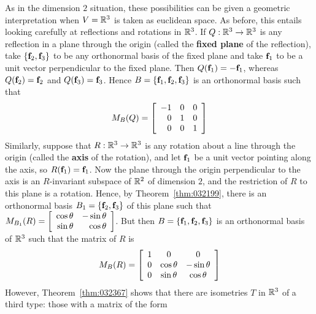 As in the dimension $2$ situation, these possibilities can be given a geometric interpretation when $V = \mathbb{R}^3$ is taken as euclidean space. As before, this entails looking carefully at reflections and rotations in $\mathbb{R}^3$. If $Q : \mathbb{R}^3 \to \mathbb{R}^3$ is any reflection in a plane through the origin (called the \textbf{fixed plane} of the reflection), take $\{\textbf{f}_{2}, \textbf{f}_{3}\}$ to be any orthonormal basis of the fixed plane and take $\textbf{f}_{1}$ to be a unit vector perpendicular to the fixed plane. Then $Q(\textbf{f}_{1}) = -\textbf{f}_{1}$, whereas $Q(\textbf{f}_{2}) = \textbf{f}_{2}$ and $Q(\textbf{f}_{3}) = \textbf{f}_{3}$. Hence $B = \{\textbf{f}_{1}, \textbf{f}_{2}, \textbf{f}_{3}\}$ is an orthonormal basis such that
\begin{equation*}
M_B(Q) =
\left[ \begin{array}{rrr}
-1 & 0 & 0 \\
0 & 1 & 0 \\
0 & 0 & 1
\end{array} \right]
\end{equation*}
Similarly, suppose that $R : \mathbb{R}^3 \to \mathbb{R}^3$ is any rotation about a line through the origin (called the \textbf{axis} of the rotation), and let $\textbf{f}_{1}$ be a unit vector pointing along the axis, so $R(\textbf{f}_{1}) = \textbf{f}_{1}$. Now the plane through the origin perpendicular to the axis is an $R$-invariant subspace of $\mathbb{R}^2$ of dimension $2$, and the restriction of $R$ to this plane is a rotation. Hence, by Theorem~\ref{thm:032199}, there is an orthonormal basis $B_{1} = \{\textbf{f}_{2}, \textbf{f}_{3}\}$ of this plane such that $M_{B_1}(R) = 
\left[ \begin{array}{rr}
\cos \theta & - \sin \theta \\
\sin \theta & \cos \theta
\end{array} \right]$. But then $B = \{\textbf{f}_{1}, \textbf{f}_{2}, \textbf{f}_{3}\}$ is an orthonormal basis of $\mathbb{R}^3$ such that the matrix of $R$ is
\begin{equation*}
M_B(R) = 
\left[ \begin{array}{ccc}
1 & 0 & 0 \\
0 & \cos \theta & - \sin \theta \\
0 & \sin \theta & \cos \theta
\end{array} \right]
\end{equation*}
However, Theorem~\ref{thm:032367} shows that there are isometries $T$ in $\mathbb{R}^3$ of a third type: those with a matrix of the form
